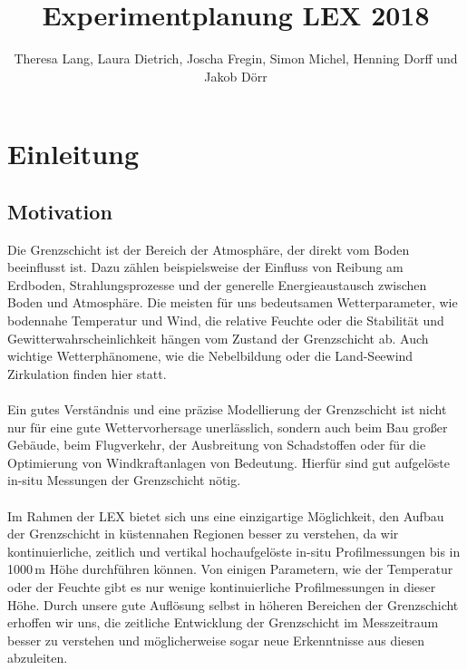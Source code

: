 \documentclass[a4paper,11pt,DIV=calc,tablecaptionabove,headinclude,twoside]{article}
\title{Experimentplanung LEX 2018}%
\author{Theresa Lang, Laura Dietrich, Joscha Fregin, Simon Michel, Henning Dorff und Jakob Dörr}
\begin{document}
\maketitle



\section{Einleitung}
\subsection{Motivation}
Die Grenzschicht ist der Bereich der Atmosphäre, der direkt vom Boden beeinflusst ist. Dazu zählen beispielsweise der Einfluss von Reibung am Erdboden, Strahlungsprozesse und der generelle Energieaustausch zwischen Boden und Atmosphäre. Die meisten für uns bedeutsamen Wetterparameter, wie bodennahe Temperatur und Wind, die relative Feuchte oder die Stabilität und Gewitterwahrscheinlichkeit hängen vom Zustand der Grenzschicht ab. Auch wichtige Wetterphänomene, wie die Nebelbildung oder die Land-Seewind Zirkulation finden hier statt.\\\\
Ein gutes Verständnis und eine präzise Modellierung der Grenzschicht ist nicht nur für eine gute Wettervorhersage unerlässlich, sondern auch beim Bau großer Gebäude, beim Flugverkehr, der Ausbreitung von Schadstoffen oder für die Optimierung von Windkraftanlagen von Bedeutung. Hierfür sind gut aufgelöste in-situ Messungen der Grenzschicht nötig.\\\\
Im Rahmen der LEX bietet sich uns eine einzigartige Möglichkeit, den Aufbau der Grenzschicht in küstennahen Regionen besser zu verstehen, da wir kontinuierliche, zeitlich und vertikal hochaufgelöste in-situ Profilmessungen bis in 1000\,m Höhe durchführen können. Von einigen Parametern, wie der Temperatur oder der Feuchte gibt es nur wenige kontinuierliche Profilmessungen in dieser Höhe. Durch unsere gute Auflösung selbst in höheren Bereichen der Grenzschicht erhoffen wir uns, die zeitliche Entwicklung der Grenzschicht im Messzeitraum besser zu verstehen und möglicherweise sogar neue Erkenntnisse aus diesen abzuleiten.
\end{document}
